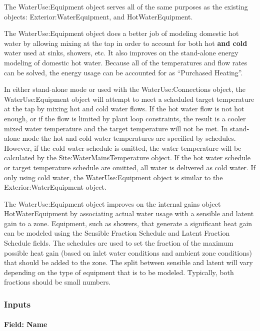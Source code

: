 The WaterUse:Equipment object serves all of the same purposes as the existing objects: Exterior:WaterEquipment, and HotWaterEquipment.

The WaterUse:Equipment object does a better job of modeling domestic hot water by allowing mixing at the tap in order to account for both hot \textbf{and cold} water used at sinks, showers, etc. It also improves on the stand-alone energy modeling of domestic hot water. Because all of the temperatures and flow rates can be solved, the energy usage can be accounted for as ``Purchased Heating''.

In either stand-alone mode or used with the WaterUse:Connections object, the WaterUse:Equipment object will attempt to meet a scheduled target temperature at the tap by mixing hot and cold water flows. If the hot water flow is not hot enough, or if the flow is limited by plant loop constraints, the result is a cooler mixed water temperature and the target temperature will not be met. In stand-alone mode the hot and cold water temperatures are specified by schedules. However, if the cold water schedule is omitted, the water temperature will be calculated by the Site:WaterMainsTemperature object. If the hot water schedule or target temperature schedule are omitted, all water is delivered as cold water. If only using cold water, the WaterUse:Equipment object is similar to the Exterior:WaterEquipment object.

The WaterUse:Equipment object improves on the internal gains object HotWaterEquipment by associating actual water usage with a sensible and latent gain to a zone. Equipment, such as showers, that generate a significant heat gain can be modeled using the Sensible Fraction Schedule and Latent Fraction Schedule fields. The schedules are used to set the fraction of the maximum possible heat gain (based on inlet water conditions and ambient zone conditions) that should be added to the zone. The split between sensible and latent will vary depending on the type of equipment that is to be modeled. Typically, both fractions should be small numbers.

\subsubsection{Inputs}\label{inputs-053}

\paragraph{Field: Name}\label{field-name-051}


